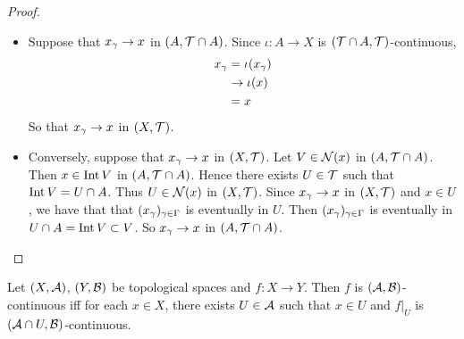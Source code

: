 \documentclass{book}
\begin{document}
\begin{proof}\
	\begin{itemize}
		\item Suppose that $x_{\gamma} \rightarrow x$ in $(A, \mathcal{T} \cap A)$. Since $\iota: A \rightarrow X$ is $(\mathcal{T} \cap A, \mathcal{T})$-continuous, 
		\begin{align*}
			x_{\gamma} 
			&= \iota(x_{\gamma}) \\
			& \rightarrow \iota(x) \\
			&= x
		\end{align*}
		So that $x_{\gamma} \rightarrow x$ in $(X, \mathcal{T})$.  
		\item Conversely, suppose that $x_{\gamma} \rightarrow x$ in $(X, \mathcal{T})$. Let $V \in \mathcal{N}(x)$ in $(A, \mathcal{T} \cap A)$. Then $x \in \operatorname{Int} V$ in  $(A, \mathcal{T} \cap A)$. Hence there exists $U \in \mathcal{T}$ such that $\operatorname{Int} V = U \cap A$. Thus $U \in \mathcal{N}(x)$ in $(X, \mathcal{T})$. Since $x_{\gamma} \rightarrow x$ in $(X, \mathcal{T})$ and $x \in U$, we have that that $(x_{\gamma})_{\gamma \in \Gamma}$ is eventually in $U$. Then $(x_{\gamma})_{\gamma \in \Gamma}$ is eventually in $U \cap A = \operatorname{Int} V \subset V$. So $x_{\gamma} \rightarrow x$ in $(A, \mathcal{T} \cap A)$. 
	\end{itemize}
\end{proof}

\begin{ex} 
	Let $(X, \mathcal{A})$, $(Y, \mathcal{B})$ be topological spaces and $f:X \rightarrow Y$. Then $f$ is $(\mathcal{A}, \mathcal{B})$-continuous iff for each $x \in X$, there exists $U \in \mathcal{A}$ such that $x \in U$ and $f|_U$ is $(\mathcal{A} \cap U, \mathcal{B})$-continuous.
\end{ex}
\end{document}
